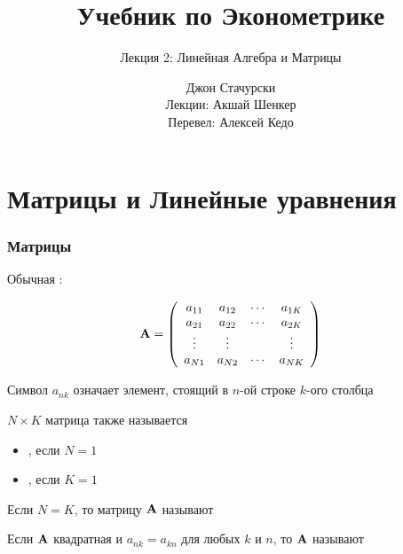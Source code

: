 






\title{Учебник по Эконометрике}

\subtitle
{Лекция 2: Линейная Алгебра и Матрицы}

\author{Джон Стачурски \\ \vspace{.5em} 
	\scriptsize Лекции: Акшай Шенкер \\ \vspace{.1em} 
	\scriptsize Перевел: Алексей Кедо}






\begin{frame}
  \titlepage
\end{frame}

\section{Матрицы и Линейные уравнения}

\begin{frame}
    
    \vspace{2em}
    \frametitle{Матрицы}

    Обычная : 
    
    \begin{equation*}
        \mathbf A = 
        \left(
        \begin{array}{cccc}
            a_{11} & a_{12} & \cdots & a_{1K} \\
            a_{21} & a_{22} & \cdots & a_{2K} \\
            \vdots & \vdots &  & \vdots \\
            a_{N1} & a_{N2} & \cdots & a_{NK} 
        \end{array}
        \right)
    \end{equation*}
    
    \vspace{.7em}
    Символ $a_{nk}$ означает элемент, стоящий в $n$-ой строке $k$-ого столбца

\end{frame}


\begin{frame}
    
    \vspace{2em}
    $N \times K$ матрица также называется 
    \begin{itemize}
        \item {}, если $N = 1$
        \item {}, если $K = 1$
    \end{itemize}
    
    \vspace{.7em}
    Если $N = K$, то матрицу $\mathbf A$ называют 
    
    Если $\mathbf A$ квадратная и $a_{nk} = a_{kn}$ для любых $k$ и $n$, то $\mathbf A$
    называют    
    
\end{frame}


